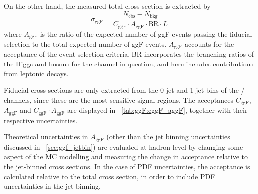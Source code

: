On the other hand, the measured total cross section is extracted by
\begin{equation}
	\sigma_{\text{ggF}} = \frac{N_{\text{obs}} - N_{\text{bkg}}}{C_{\text{ggF}} \cdot A_{\text{ggF}} \cdot \text{BR} \cdot L}
	\label{eq:ggF:total_xs}
\end{equation}
where $A_{\text{ggF}}$ is the ratio of the expected number of ggF events passing the 
fiducial selection to the total expected number of ggF events. $A_{\text{ggF}}$ accounts 
for the acceptance of the event selection criteria. BR incorporates the branching 
ratios of the Higgs and \PW bosons for the channel in question, and here includes 
contributions from leptonic \Ptau decays.

Fiducial cross sections are only extracted from the 0-jet and 1-jet bins of the \emch/\mech 
channels, since these are the most sensitive signal regions. The acceptances 
$C_{\text{ggF}}$, $A_{\text{ggF}}$ and $C_{\text{ggF}} \cdot A_{\text{ggF}}$ are displayed 
in \Table~\ref{tab:ggF:cggF_aggF}, together with their respective uncertainties.

Theoretical uncertainties in $A_{\text{ggF}}$ (other than the jet binning uncertainties 
discussed in \Section~\ref{sec:ggf_jetbin}) are evaluated at hadron-level by changing some 
aspect of the MC modelling and measuring the change in acceptance relative to the 
jet-binned cross sections. In the case of PDF uncertainties, the acceptance is calculated 
relative to the total cross section, in order to include PDF uncertainties in the jet 
binning.


